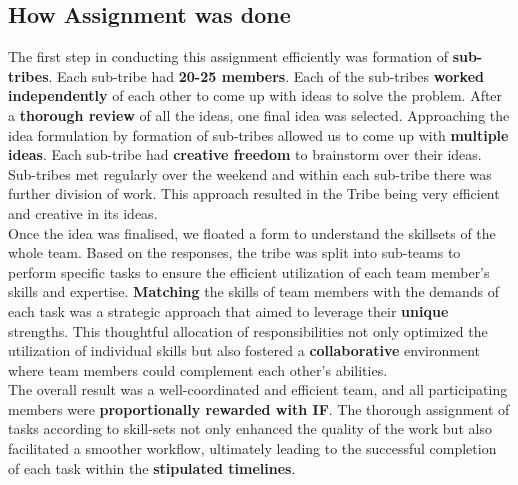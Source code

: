 \newpage
\subsection{How Assignment was done}


The first step in conducting this assignment efficiently was formation of \textbf{sub-tribes}. Each sub-tribe had \textbf{20-25 members}. Each of the sub-tribes \textbf{worked independently} of each other to come up with ideas to solve the problem. After a \textbf{thorough review} of all the ideas, one final idea was selected. Approaching the idea formulation by formation of sub-tribes allowed us to come up with \textbf{multiple ideas}. Each sub-tribe had \textbf{creative freedom} to brainstorm over their ideas. Sub-tribes met regularly over the weekend and within each sub-tribe there was further division of work. This approach resulted in the Tribe being very efficient and creative in its ideas.
\\

Once the idea was finalised, we floated a form to understand the skillsets of the whole team. Based on the responses, the tribe was split into sub-teams to perform specific tasks to ensure the efficient utilization of each team member's skills and expertise. \textbf{Matching} the skills of team members with the demands of each task was a strategic approach that aimed to leverage their \textbf{unique} strengths. This thoughtful allocation of responsibilities not only optimized the utilization of individual skills but also fostered a \textbf{collaborative} environment where team members could complement each other's abilities.
\\

The overall result was a well-coordinated and efficient team, and all participating members were \textbf{proportionally rewarded with IF}. The thorough assignment of tasks according to skill-sets not only enhanced the quality of the work but also facilitated a smoother workflow, ultimately leading to the successful completion of each task within the \textbf{stipulated timelines}.
\\

